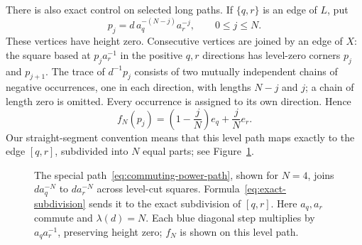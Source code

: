 There is also exact control on selected long paths.  If $\{q,r\}$ is
an edge of $L$, put
\begin{equation}\label{eq:commuting-power-path}
 p_j=d\,a_q^{-(N-j)}a_r^{-j},\qquad 0\leq j\leq N.
\end{equation}
These vertices have height zero.  Consecutive vertices are joined by
an edge of $X$: the square based at $p_j a_r^{-1}$ in the positive
$q,r$ directions has level-zero corners $p_j$ and $p_{j+1}$.
The trace of $d^{-1}p_j$ consists of two mutually independent chains
of negative occurrences, one in each direction, with lengths $N-j$
and $j$; a chain of length zero is omitted.  Every occurrence is
assigned to its own direction.  Hence
\begin{equation}\label{eq:exact-subdivision}
 f_N(p_j)=\left(1-\frac{j}{N}\right)e_q+\frac{j}{N}e_r.
\end{equation}
Our straight-segment convention means that this level path maps
exactly to the edge $[q,r]$, subdivided into $N$ equal parts; see
Figure~\ref{fig:commuting-path}.

\begin{figure}[ht]
 \centering
 \caption{The special path~\eqref{eq:commuting-power-path}, shown for
 $N=4$, joins $d a_q^{-N}$ to $d a_r^{-N}$ across level-cut squares.
 Formula~\eqref{eq:exact-subdivision} sends it to the exact subdivision
 of $[q,r]$.  Here $a_q,a_r$ commute and $\lambda(d)=N$.
 Each blue diagonal step multiplies by $a_q a_r^{-1}$, preserving
 height zero; $f_N$ is shown on this level path.}
 \label{fig:commuting-path}
\end{figure}

